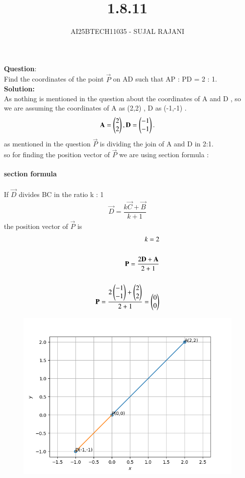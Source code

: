 \documentclass[journal,12pt,onecolumn]{IEEEtran}
\begin{document}
\title{1.8.11}
\author{AI25BTECH11035 - SUJAL RAJANI}
{\let\newpage\relax\maketitle}
\textbf{Question}:
\\
\noindent Find the coordinates of the point $\vec{P}$ on AD such that AP : PD = 2 : 1. 
\\
\textbf{Solution:} 
\\
As nothing is mentioned in the question about the coordinates of A and D , so we are assuming the coordinates of A as (2,2) , D as (-1,-1) .
\begin{align}
			\mathbf A = \begin{pmatrix}2\\2\end{pmatrix},\mathbf D = \begin{pmatrix}-1\\-1\end{pmatrix}.
\end{align}
as mentioned in the question $\vec{P}$ is dividing the join of A and D in 2:1.
\\
so for finding the position vector of $\vec{P}$ we are using section formula :
\\
\\
\textbf{section formula }
\\
\\
If $\vec{D}$ divides BC in the ratio k : 1
\begin{align*}
     \vec{D}=\dfrac{k\vec{C}+\vec{B}}{k+1}
\end{align*}
the position vector of  $\vec{P}$ is 
\begin{align*}
k=2
      \\
      \\
     \mathbf{P}=\dfrac{2\mathbf{D}+\mathbf{A}}{2+1}
     \\
     \\
     \mathbf{P}=\dfrac{2\begin{pmatrix}-1\\-1\end{pmatrix}+\begin{pmatrix}2\\2\end{pmatrix}}{2+1}=\begin{pmatrix}0\\0\end{pmatrix}
\end{align*}
        \begin{figure}[H]
    \centering
    \includegraphics[width = 0.7\columnwidth]{figs/img.png}
    \caption*{}
    \label{figs}
\end{figure}
\end{document}
